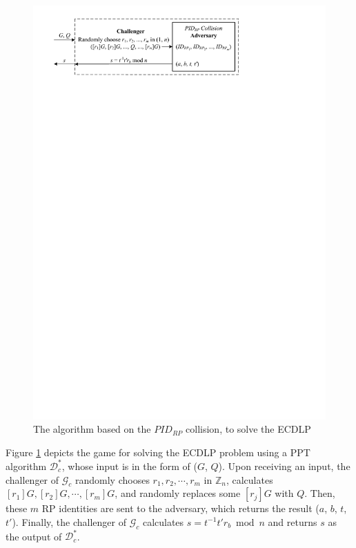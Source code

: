 \begin{figure}[tb]
  \centering
  \includegraphics[width=0.97\linewidth]{fig/ecdlp_algorithm.pdf}
  \caption{The algorithm based on the $PID_{RP}$ collision, to solve the ECDLP}
  \label{fig:ecdlp_algorithm}
\end{figure}

Figure \ref{fig:ecdlp_algorithm} depicts the game for solving the ECDLP problem using a PPT algorithm $\mathcal{D}^*_c$, whose input is in the form of ($G$, $Q$).
Upon receiving an input, the challenger of $\mathcal{G}_c$ randomly chooses $r_1, r_2, \cdots, r_m$ in $\mathbb{Z}_n$, calculates $[r_1]G, [r_2]G, \cdots, [r_m]G$, and randomly replaces some $[r_j]G$ with $Q$.
Then, these $m$ RP identities are sent to the adversary, which returns the result ($a$, $b$, $t$, $t'$).
Finally, the challenger of $\mathcal{G}_c$ calculates $s = t^{-1}t'r_b \bmod n$ and returns $s$ as the output of $\mathcal{D}^*_c$.

